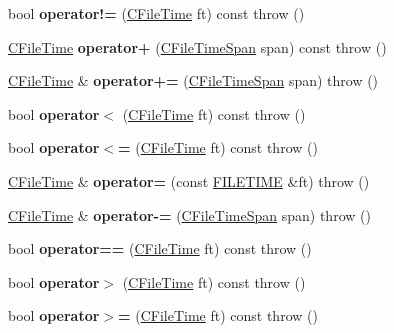 \begin{DoxyCompactItemize}
\item 
\mbox{\label{class_a_t_l_1_1_c_file_time_a540e7de7160d879c08d478cff114b6ee}} 
bool {\bfseries operator!=} (\hyperlink{class_a_t_l_1_1_c_file_time}{C\+File\+Time} ft) const  throw ()
\item 
\mbox{\label{class_a_t_l_1_1_c_file_time_a599da1330a85d7893088f815ddb6f397}} 
\hyperlink{class_a_t_l_1_1_c_file_time}{C\+File\+Time} {\bfseries operator+} (\hyperlink{class_a_t_l_1_1_c_file_time_span}{C\+File\+Time\+Span} span) const  throw ()
\item 
\mbox{\label{class_a_t_l_1_1_c_file_time_a4ecf22e6019132042279ce163c28cae2}} 
\hyperlink{class_a_t_l_1_1_c_file_time}{C\+File\+Time} \& {\bfseries operator+=} (\hyperlink{class_a_t_l_1_1_c_file_time_span}{C\+File\+Time\+Span} span)  throw ()
\item 
\mbox{\label{class_a_t_l_1_1_c_file_time_a13d3775d277542c10cfc48774a95a3ae}} 
bool {\bfseries operator$<$} (\hyperlink{class_a_t_l_1_1_c_file_time}{C\+File\+Time} ft) const  throw ()
\item 
\mbox{\label{class_a_t_l_1_1_c_file_time_a2b05e733fdb8cf4c141cf3dfd0fdb928}} 
bool {\bfseries operator$<$=} (\hyperlink{class_a_t_l_1_1_c_file_time}{C\+File\+Time} ft) const  throw ()
\item 
\mbox{\label{class_a_t_l_1_1_c_file_time_ae6ffec257e32068d348f6da0ae288d67}} 
\hyperlink{class_a_t_l_1_1_c_file_time}{C\+File\+Time} \& {\bfseries operator=} (const \hyperlink{struct___f_i_l_e_t_i_m_e}{F\+I\+L\+E\+T\+I\+ME} \&ft)  throw ()
\item 
\mbox{\label{class_a_t_l_1_1_c_file_time_ab81c37e2b1f176132aea43b739cc7f04}} 
\hyperlink{class_a_t_l_1_1_c_file_time}{C\+File\+Time} \& {\bfseries operator-\/=} (\hyperlink{class_a_t_l_1_1_c_file_time_span}{C\+File\+Time\+Span} span)  throw ()
\item 
\mbox{\label{class_a_t_l_1_1_c_file_time_a2a0aef07b09fbea18829d27a44543faa}} 
bool {\bfseries operator==} (\hyperlink{class_a_t_l_1_1_c_file_time}{C\+File\+Time} ft) const  throw ()
\item 
\mbox{\label{class_a_t_l_1_1_c_file_time_af3a049cbf89521281c6e6fe0004b9b73}} 
bool {\bfseries operator$>$} (\hyperlink{class_a_t_l_1_1_c_file_time}{C\+File\+Time} ft) const  throw ()
\item 
\mbox{\label{class_a_t_l_1_1_c_file_time_ab01616c0d07dbb37ced69741370d16c5}} 
bool {\bfseries operator$>$=} (\hyperlink{class_a_t_l_1_1_c_file_time}{C\+File\+Time} ft) const  throw ()
\end{DoxyCompactItemize}
